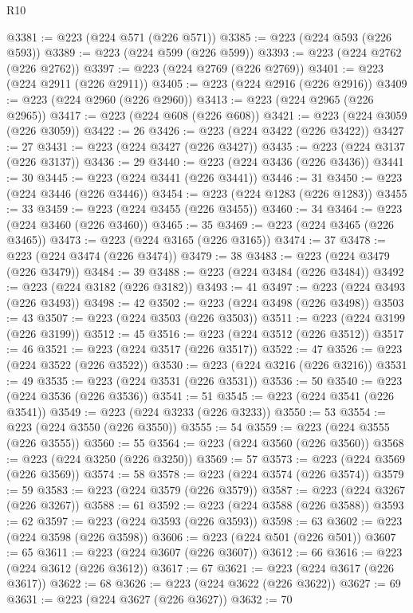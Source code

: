 \begin{lexlean}{R10}
\begin{coremodule}
{{{{{{{{{{{{{{{{{{{{{{{{{{{{{{{{{{{{{{{{{{{{{{{{{{{{{{{{{{{{{{{{{{{{{{{{{{{{{{{{{{{{@3381 := @223 (@224 @571 (@226 @571))
@3385 := @223 (@224 @593 (@226 @593))
@3389 := @223 (@224 @599 (@226 @599))
@3393 := @223 (@224 @2762 (@226 @2762))
@3397 := @223 (@224 @2769 (@226 @2769))
@3401 := @223 (@224 @2911 (@226 @2911))
@3405 := @223 (@224 @2916 (@226 @2916))
@3409 := @223 (@224 @2960 (@226 @2960))
@3413 := @223 (@224 @2965 (@226 @2965))
@3417 := @223 (@224 @608 (@226 @608))
@3421 := @223 (@224 @3059 (@226 @3059))
@3422 := 26
@3426 := @223 (@224 @3422 (@226 @3422))
@3427 := 27
@3431 := @223 (@224 @3427 (@226 @3427))
@3435 := @223 (@224 @3137 (@226 @3137))
@3436 := 29
@3440 := @223 (@224 @3436 (@226 @3436))
@3441 := 30
@3445 := @223 (@224 @3441 (@226 @3441))
@3446 := 31
@3450 := @223 (@224 @3446 (@226 @3446))
@3454 := @223 (@224 @1283 (@226 @1283))
@3455 := 33
@3459 := @223 (@224 @3455 (@226 @3455))
@3460 := 34
@3464 := @223 (@224 @3460 (@226 @3460))
@3465 := 35
@3469 := @223 (@224 @3465 (@226 @3465))
@3473 := @223 (@224 @3165 (@226 @3165))
@3474 := 37
@3478 := @223 (@224 @3474 (@226 @3474))
@3479 := 38
@3483 := @223 (@224 @3479 (@226 @3479))
@3484 := 39
@3488 := @223 (@224 @3484 (@226 @3484))
@3492 := @223 (@224 @3182 (@226 @3182))
@3493 := 41
@3497 := @223 (@224 @3493 (@226 @3493))
@3498 := 42
@3502 := @223 (@224 @3498 (@226 @3498))
@3503 := 43
@3507 := @223 (@224 @3503 (@226 @3503))
@3511 := @223 (@224 @3199 (@226 @3199))
@3512 := 45
@3516 := @223 (@224 @3512 (@226 @3512))
@3517 := 46
@3521 := @223 (@224 @3517 (@226 @3517))
@3522 := 47
@3526 := @223 (@224 @3522 (@226 @3522))
@3530 := @223 (@224 @3216 (@226 @3216))
@3531 := 49
@3535 := @223 (@224 @3531 (@226 @3531))
@3536 := 50
@3540 := @223 (@224 @3536 (@226 @3536))
@3541 := 51
@3545 := @223 (@224 @3541 (@226 @3541))
@3549 := @223 (@224 @3233 (@226 @3233))
@3550 := 53
@3554 := @223 (@224 @3550 (@226 @3550))
@3555 := 54
@3559 := @223 (@224 @3555 (@226 @3555))
@3560 := 55
@3564 := @223 (@224 @3560 (@226 @3560))
@3568 := @223 (@224 @3250 (@226 @3250))
@3569 := 57
@3573 := @223 (@224 @3569 (@226 @3569))
@3574 := 58
@3578 := @223 (@224 @3574 (@226 @3574))
@3579 := 59
@3583 := @223 (@224 @3579 (@226 @3579))
@3587 := @223 (@224 @3267 (@226 @3267))
@3588 := 61
@3592 := @223 (@224 @3588 (@226 @3588))
@3593 := 62
@3597 := @223 (@224 @3593 (@226 @3593))
@3598 := 63
@3602 := @223 (@224 @3598 (@226 @3598))
@3606 := @223 (@224 @501 (@226 @501))
@3607 := 65
@3611 := @223 (@224 @3607 (@226 @3607))
@3612 := 66
@3616 := @223 (@224 @3612 (@226 @3612))
@3617 := 67
@3621 := @223 (@224 @3617 (@226 @3617))
@3622 := 68
@3626 := @223 (@224 @3622 (@226 @3622))
@3627 := 69
@3631 := @223 (@224 @3627 (@226 @3627))
@3632 := 70
}}}}}}}}}}}}}}}}}}}}}}}}}}}}}}}}}}}}}}}}}}}}}}}}}}}}}}}}}}}}}}}}}}}}}}}}}}}}}}}}}}}}
\end{coremodule}
\end{lexlean}
